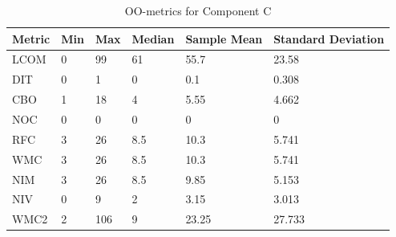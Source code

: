 


\begin{table}[]
\centering
\caption{OO-metrics for Component C}
\label{tab:oometrics-config}
\begin{tabular}{|l|l|l|l|l|l|}
\hline
\textbf{Metric} & \textbf{Min} & \textbf{Max} & \textbf{Median} & \textbf{Sample Mean} & \textbf{Standard Deviation} \\ \hline
LCOM            & 0            & 99           & 61              & 55.7                 & 23.58                       \\ \hline
DIT             & 0            & 1            & 0               & 0.1                  & 0.308                       \\ \hline
CBO             & 1            & 18           & 4               & 5.55                 & 4.662                       \\ \hline
NOC             & 0            & 0            & 0               & 0                    & 0                           \\ \hline
RFC             & 3            & 26           & 8.5             & 10.3                 & 5.741                       \\ \hline
WMC             & 3            & 26           & 8.5             & 10.3                 & 5.741                       \\ \hline
NIM             & 3            & 26           & 8.5             & 9.85                 & 5.153                       \\ \hline
NIV             & 0            & 9            & 2               & 3.15                 & 3.013                       \\ \hline
WMC2            & 2            & 106          & 9              & 23.25                 & 27.733                      \\ \hline
\end{tabular}
\end{table}



